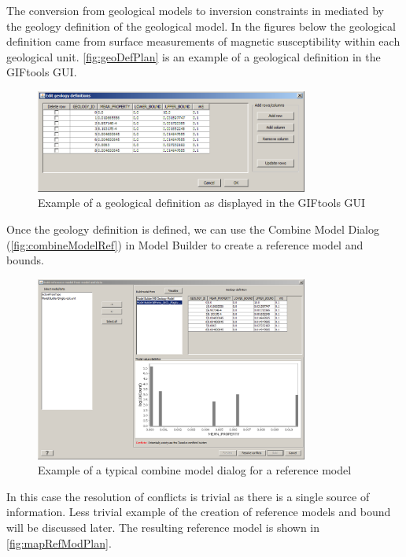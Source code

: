 The conversion from geological models to inversion constraints in mediated by the geology definition of the geological model. In the figures below the geological definition came from surface measurements of magnetic susceptibility within each geological unit. \autoref{fig:geoDefPlan} is an example of a geological definition in the GIFtools GUI.
\begin{figure} [h]
    \centering
    \includegraphics[width=0.8\textwidth]{images/MaptoModel/geoDefPlan.PNG}
    \caption{Example of a geological definition as displayed in the GIFtools GUI}
    \label{fig:geoDefPlan}
\end{figure}
Once the geology definition is defined, we can use the Combine Model Dialog (\autoref{fig:combineModelRef}) in Model Builder to create a reference model and bounds. 
\begin{figure} [h]
    \centering
    \includegraphics[width=0.8\textwidth]{images/MaptoModel/combineModelRef.PNG}
    \caption{Example of a typical combine model dialog for a reference model}
    \label{fig:combineModelRef}
\end{figure}
In this case the resolution of conflicts is trivial as there is a single source of information. Less trivial example of the creation of reference models and bound will be discussed later. The resulting reference model is shown in \autoref{fig:mapRefModPlan}.
